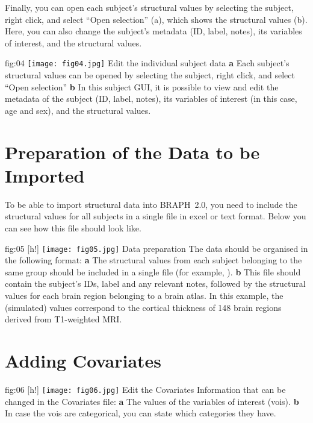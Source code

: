 \documentclass[justified]{tufte-handout}
\begin{document}
Finally, you can open each subject's structural values by selecting the subject, right click, and select ``Open selection'' (a), which shows the structural values (b). Here, you can also change the subject's metadata (ID, label, notes), its variables of interest, and the structural values.

	{fig:04}
	{\texttt{[image: fig04.jpg]}
	}
	{Edit the individual subject data}
	{
	{\bf a}  Each subject's structural values can be opened by selecting the subject, right click, and select ``Open selection''
	{\bf b} In this subject GUI, it is possible to view and edit the metadata of the subject (ID, label, notes), its variables of interest (in this case, age and sex), and the structural values. 
	}

\clearpage
\section{Preparation of the Data to be Imported}

To be able to import structural data into BRAPH~2.0, you need to include the structural values for all subjects in a single file in excel or text format. Below you can see how this file should look like.

	{fig:05}
	{
	[h!]
	\texttt{[image: fig05.jpg]}
	}
	{Data preparation}
	{
	The data should be organised in the following format:
	{\bf a} The structural values from each subject belonging to the same group should be included in a single file (for example, ). 
	{\bf b} This file should contain the subject's IDs, label and any relevant notes, followed by the structural values for each brain region belonging to a brain atlas. In this example, the (simulated) values correspond to the cortical thickness of 148 brain regions derived from T1-weighted MRI.
	} 

\section{Adding Covariates}

	{fig:06}
	{
	[h!]
	\texttt{[image: fig06.jpg]}
	}
	{Edit the Covariates}
	{
	Information that can be changed in the Covariates file: 
	{\bf a} The values of the variables of interest (vois).
	{\bf b} In case the vois are categorical, you can state which categories they have.
	}
	
\end{document}
